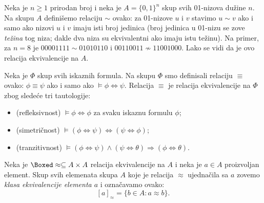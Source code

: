 \begin{EX}\label{ft07.ex.01-weight}
  Neka je $n \ge 1$ prirodan broj i neka je $A = \{0,1\}^n$ skup svih 01-nizova du\v zine $n$. Na skupu $A$ defini\v semo
  relaciju $\sim$ ovako: za 01-nizove $u$ i $v$ stavimo $u \sim v$ ako i samo ako nizovi $u$ i $v$ imaju isti broj jedinica
  (broj jedinica u 01-nizu se zove \emph{te\v zina} tog niza; dakle dva niza su ekvivalentni ako imaju istu te\v zinu).
  Na primer, za $n = 8$ je $00001111 \sim 01010110$ i $00110011 \not\sim 11001000$.
  Lako se vidi da je ovo relacija ekvivalencije na $A$.
\end{EX}

\begin{EX}\label{ft07.ex.iskazne-fle}
  Neka je $\Phi$ skup svih iskaznih formula. Na skupu $\Phi$ smo definisali relaciju $\equiv$ ovako:
  $\phi \equiv \psi$ ako i samo ako $\vDash \phi \Leftrightarrow \psi$. Relacija $\equiv$ je relacija
  ekvivalencije na $\Phi$ zbog slede\'ce tri tautologije:
  \begin{itemize}\itemsep -1.5pt
  \item
    (refleksivnost) $\vDash \phi \Leftrightarrow \phi$ za svaku iskaznu formulu $\phi$;
  \item
    (simetri\v cnost) $\vDash (\phi \Leftrightarrow \psi) \Leftrightarrow (\psi \Leftrightarrow \phi)$;
  \item
    (tranzitivnost) $\vDash (\phi \Leftrightarrow \psi) \land (\psi \Leftrightarrow \theta) \Rightarrow (\phi \Leftrightarrow \theta)$.
  \end{itemize}
\end{EX}

Neka je $\Boxed\approx \subseteq A \times A$ relacija ekvivalencije na $A$ i neka je $a \in A$ proizvoljan element.
Skup svih elemenata skupa $A$ koje je relacija $\approx$ ujedna\v cila sa $a$ zovemo \emph{klasa ekvivalencije elementa $a$}
i ozna\v cavamo ovako:
$$
  [a]_\approx = \{ b \in A : a \approx b \}.
$$

